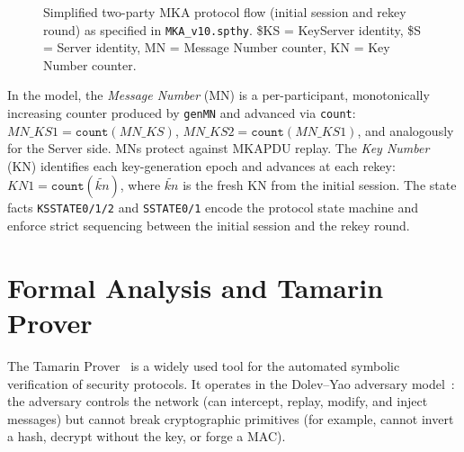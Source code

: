 \begin{figure}[htbp]
{%
}
\caption{Simplified two-party MKA protocol flow (initial session and rekey round) as specified in \texttt{MKA\_v10.spthy}. \$KS = KeyServer identity, \$S = Server identity, MN = Message Number counter, KN = Key Number counter.}
\label{fig:mka_flow}
\end{figure}

In the model, the \emph{Message Number} (MN) is a per-participant, monotonically increasing counter produced by \texttt{genMN} and advanced via \texttt{count}: $\mathit{MN\_KS1} = \mathtt{count}(\mathit{MN\_KS})$, $\mathit{MN\_KS2} = \mathtt{count}(\mathit{MN\_KS1})$, and analogously for the Server side. MNs protect against MKAPDU replay. The \emph{Key Number} (KN) identifies each key-generation epoch and advances at each rekey: $\mathit{KN1} = \mathtt{count}(\tilde{kn})$, where $\tilde{kn}$ is the fresh KN from the initial session. The state facts \texttt{KSSTATE0/1/2} and \texttt{SSTATE0/1} encode the protocol state machine and enforce strict sequencing between the initial session and the rekey round.

\section{Formal Analysis and Tamarin Prover}
\label{sec:analysis}

The Tamarin Prover~\cite{meier2013tamarin,basin2015tamarin} is a widely used tool for the automated symbolic verification of security protocols. It operates in the Dolev--Yao adversary model~\cite{dolevyao1983}: the adversary controls the network (can intercept, replay, modify, and inject messages) but cannot break cryptographic primitives (for example, cannot invert a hash, decrypt without the key, or forge a MAC).

